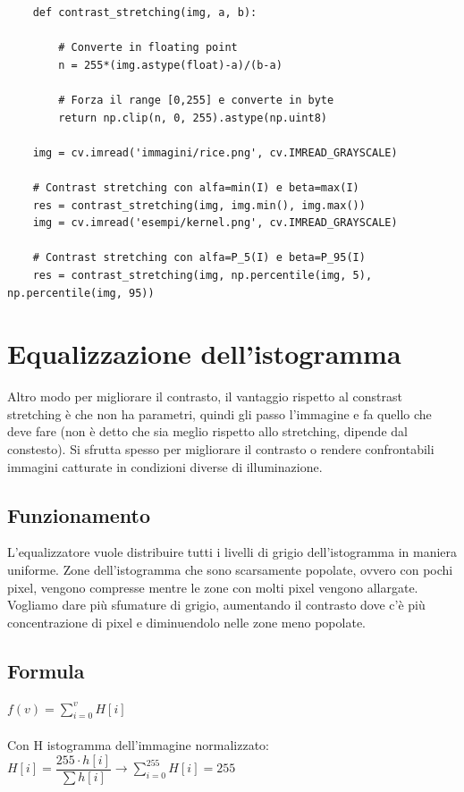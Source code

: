 \begin{lstlisting}
	def contrast_stretching(img, a, b):
		
		# Converte in floating point
		n = 255*(img.astype(float)-a)/(b-a)
		
		# Forza il range [0,255] e converte in byte
		return np.clip(n, 0, 255).astype(np.uint8)
	
	img = cv.imread('immagini/rice.png', cv.IMREAD_GRAYSCALE)
	
	# Contrast stretching con alfa=min(I) e beta=max(I)
	res = contrast_stretching(img, img.min(), img.max())
	img = cv.imread('esempi/kernel.png', cv.IMREAD_GRAYSCALE)
	
	# Contrast stretching con alfa=P_5(I) e beta=P_95(I)
	res = contrast_stretching(img, np.percentile(img, 5), np.percentile(img, 95))
\end{lstlisting}

\section{Equalizzazione dell'istogramma}

Altro modo per migliorare il contrasto, il vantaggio rispetto al constrast stretching è che non ha parametri, quindi gli passo l'immagine e fa quello che deve fare (non è detto che sia meglio rispetto allo stretching, dipende dal constesto). Si sfrutta spesso per migliorare il contrasto o rendere confrontabili immagini catturate in condizioni diverse di illuminazione.

\subsection{Funzionamento}

L'equalizzatore vuole distribuire tutti i livelli di grigio dell'istogramma in maniera uniforme. Zone dell'istogramma che sono scarsamente popolate, ovvero con pochi pixel, vengono compresse mentre le zone con molti pixel vengono allargate. Vogliamo dare più sfumature di grigio, aumentando il contrasto dove c'è più concentrazione di pixel e diminuendolo nelle zone meno popolate.

\subsection{Formula}

$f(v) = \sum_{i = 0}^{v}H[i]$\\\\Con H istogramma dell'immagine normalizzato:
$H[i] = \dfrac{255 \cdot h[i]}{\sum h[i]} \rightarrow \sum_{i = 0}^{255}H[i] = 255$


